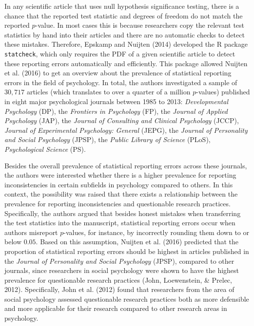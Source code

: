 \documentclass[
  english,
  man,floatsintext]{apa6}
\begin{document}
In any scientific article that uses null hypothesis significance testing, there is a chance that the reported test statistic and degrees of freedom do not match the reported \(p\)-value. In most cases this is because researchers copy the relevant test statistics by hand into their articles and there are no automatic checks to detect these mistakes. Therefore, Epskamp and Nuijten (2014) developed the R package \texttt{statcheck}, which only requires the PDF of a given scientific article to detect these reporting errors automatically and efficiently. This package allowed Nuijten et al. (2016) to get an overview about the prevalence of statistical reporting errors in the field of psychology. In total, the authors investigated a sample of \(30{,}717\) articles (which translates to over a quarter of a million \(p\)-values) published in eight major psychological journals between 1985 to 2013: \emph{Developmental Psychology} (DP), the \emph{Frontiers in Psychology} (FP), the \emph{Journal of Applied Psychology} (JAP), the \emph{Journal of Consulting and Clinical Psychology} (JCCP), \emph{Journal of Experimental Psychology: General} (JEPG), the \emph{Journal of Personality and Social Psychology} (JPSP), the \emph{Public Library of Science} (PLoS), \emph{Psychological Science} (PS).

Besides the overall prevalence of statistical reporting errors across these journals, the authors were interested whether there is a higher prevalence for reporting inconsistencies in certain subfields in psychology compared to others. In this context, the possibility was raised that there exists a relationship between the prevalence for reporting inconsistencies and questionable research practices. Specifically, the authors argued that besides honest mistakes when transferring the test statistics into the manuscript, statistical reporting errors occur when authors misreport \(p\)-values, for instance, by incorrectly rounding them down to or below \(0.05\). Based on this assumption, Nuijten et al. (2016) predicted that the proportion of statistical reporting errors should be highest in articles published in the \emph{Journal of Personality and Social Psychology} (JPSP), compared to other journals, since researchers in social psychology were shown to have the highest prevalence for questionable research practices (John, Loewenstein, \& Prelec, 2012). Specifically, John et al. (2012) found that researchers from the area of social psychology assessed questionable research practices both as more defensible and more applicable for their research compared to other research areas in psychology.
\end{document}
